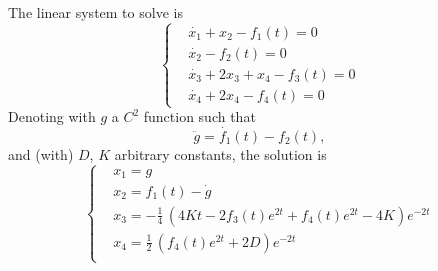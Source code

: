 \begin{example}
    The linear system to solve is
    \begin{equation*}
        \left\{
            \begin{aligned}
                & \dot{x_{1}} + x_{2} - f_{1}(t) = 0 \\
                & \dot{x_{2}} - f_{2}(t) = 0 \\
                & \dot{x_{3}} + 2x_{3} + x_{4} - f_{3}(t) = 0 \\
                & \dot{x_{4}} + 2x_{4} - f_{4}(t) = 0
            \end{aligned}
        \right.
    \end{equation*}
    Denoting with \(g\) a \(C^2\) function such that
    \[
        \ddot{g} = \dot{f_{1}}(t) - f_{2}(t),
    \]
    and (with) \(D\), \(K\) arbitrary constants, the solution is
    \begin{equation*}
        \left\{
            \begin{aligned}
                & x_{1} = g \\
                & x_{2} = f_{1}(t) - \dot{g} \\
                & x_{3} = -\frac{1}{4} \, {\left(4Kt - 2f_{3}(t) e^{2t} + f_{4}(t)e^{2t} - 4K\right)} e^{-2t}\\
                & x_{4} = \frac{1}{2} \, {\left(f_{4}(t) e^{2t} + 2D\right)} e^{-2t}\\
            \end{aligned}
        \right.
    \end{equation*}
\end{example}